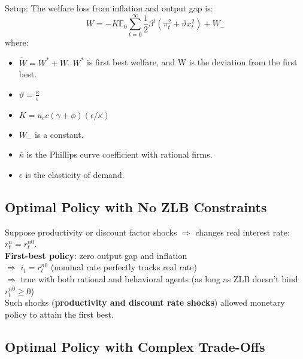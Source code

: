 \documentclass{beamer}
\begin{document}
\begin{frame}{\subsecname}
    Setup: The welfare loss from inflation and output gap is:
    \begin{equation}
        W=-K\mathbb{E}_{0}\sum_{t=0}^{\infty}\frac{1}{2}\beta^{t}\left(\pi_{t}^{2}+\vartheta x_{t}^{2}\right)+W_{-}
    \end{equation}
    where:
    \begin{itemize}
        \item $\widetilde{W}=W^{*}+W$. $W^{*}$ is first best welfare, and W is the deviation from the first best.
        \item $\vartheta=\frac{\overline{\kappa}}{\epsilon}$
        \item $K=u_{c}c\left(\gamma+\phi\right)\left(\epsilon/\overline{\kappa}\right)$
        \item $W_{-}$ is a constant.
        \item $\overline{\kappa}$ is the Phillips curve coefficient with rational firms.
        \item $\epsilon$ is the elasticity of demand.
    \end{itemize}
\end{frame}

\subsection{Optimal Policy with No ZLB Constraints}

\begin{frame}{\subsecname}
    Suppose productivity or discount factor shocks $\Rightarrow$ changes real interest rate: $r_{t}^{n} = r_{t}^{n0}$.\\
    \hfill \linebreak
    \textbf{First-best policy}: zero output gap and inflation \\$\Rightarrow$ $i_{t}=r_{t}^{n0}$ (nominal rate perfectly tracks real rate) \\$\Rightarrow$ true with both rational and behavioral agents (as long as ZLB doesn’t bind $r_{t}^{n0}\geq 0$)\\
    \hfill \linebreak
    Such shocks (\textbf{productivity and discount rate shocks}) allowed monetary
    policy to attain the first best.
\end{frame}

\subsection{Optimal Policy with Complex Trade-Offs}
\end{document}

